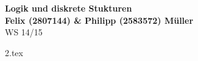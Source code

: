\documentclass[fleqn, 12pt, a4paper]{article}
\begin{document}


	\begin{center}
	{\Large{\bfseries{Logik und diskrete Stukturen}}}\\[0.5cm]
	{\large{\bfseries{Felix (2807144) \& Philipp (2583572) Müller}}}\\[0.4cm]
	WS 14/15
	\end{center}


	{2.tex}
\end{document}
